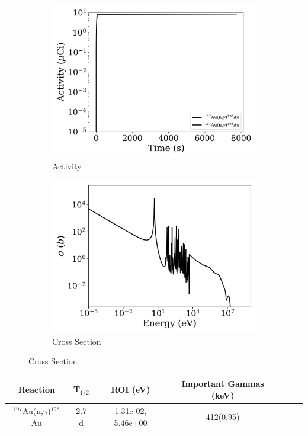 \begin{figure}[h]
\centering
\begin{subfigure}{.5\textwidth}
  \centering
     \includegraphics[width=.8\textwidth]{plot/Au-197(n,gamma)Au-198_wisconsin1} 

  \caption{Activity}
\end{subfigure}%
\begin{subfigure}{.5\textwidth}
  \centering
     \includegraphics[width=.8\textwidth]{plot/Au-197(n,gamma)Au-198} 

  \caption{Cross Section}
\end{subfigure}
\end{figure}

\begin{table}[h]
\centering
\begin{tabular}{ |c|c|c|c|c|c|c| }
 \hline
 Reaction & T$_{1/2}$ & ROI (eV) & Important Gammas (keV) \\
 \hline 
 $^{197}$Au(n,$\gamma$)$^{198}$Au &  2.7 d & 1.31e-02, 5.46e+00 & 412(0.95) \\ 
\hline
\end{tabular}
\end{table}
